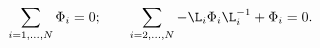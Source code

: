 \begin{equation}\label{globcond}
  \sum_{i=1,...,N}\Phi_i=0;\qquad
\sum_{i=2,...,N} -\L_i \Phi_i\L_i^{-1}+\Phi_i=0.
\end{equation}

